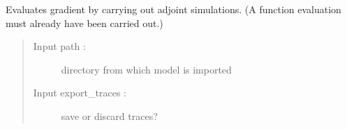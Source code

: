 \documentclass[letterpaper,10pt,english]{sphinxmanual}
\begin{document}
\begin{fulllineitems}
\begin{fulllineitems}
\end{fulllineitems}


\begin{fulllineitems}
\label{\detokenize{ref/seisflows.solver:seisflows.solver.base.base.eval_grad}}
Evaluates gradient by carrying out adjoint simulations.
(A function evaluation must already have been carried out.)
\begin{quote}\begin{description}
\item[{Input path :}] \leavevmode
directory from which model is imported

\item[{Input export\_traces :}] \leavevmode
save or discard traces?

\end{description}\end{quote}

\end{fulllineitems}


\begin{fulllineitems}
\label{\detokenize{ref/seisflows.solver:seisflows.solver.base.base.export_kernels}}
\end{fulllineitems}


\begin{fulllineitems}
\label{\detokenize{ref/seisflows.solver:seisflows.solver.base.base.export_model}}
\end{fulllineitems}


\begin{fulllineitems}
\label{\detokenize{ref/seisflows.solver:seisflows.solver.base.base.export_residuals}}
\end{fulllineitems}


\end{fulllineitems}
\end{document}
